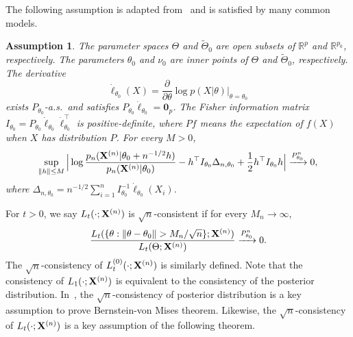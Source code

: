 \documentclass[11pt]{article}
\theoremstyle{plain}
\newtheorem{assumption}{\quad\quad Assumption}
\theoremstyle{definition}
\theoremstyle{remark}
\begin{document}
The following assumption is adapted from~\cite{Kleijn2012The} and is satisfied by many common models. 
\begin{assumption}\label{Assumption1}
    The parameter spaces $\Theta$ and $\tilde{\Theta}_0$ are open subsets of $\mathbb{R}^p$ and $\mathbb{R}^{p_0}$, respectively.
    The parameters $\theta_0$ and $\nu_0$ are inner points of $\Theta$ and $\tilde{\Theta}_0$, respectively.
    The derivative 
$$\dot{\ell}_{\theta_0}(X)=\frac{\partial}{\partial \theta}\log p(X|\theta)\Big|_{\theta=\theta_0}$$
exists $P_{\theta_0}$-a.s.\ and satisfies $P_{\theta_0}\dot{\ell}_{\theta_0}=\mathbf{0}_p$.
The Fisher information matrix $I_{\theta_0}=P_{\theta_0}\dot{\ell}_{\theta_0}\dot{\ell}_{\theta_0}^\top $ is positive-definite, where $P f$ means the expectation of $f(X)$ when $X$ has distribution $P$.
For every $M>0$,
    \begin{equation*}
        \sup_{\|h\|\leq M}\Big|
         \log \frac{p_n(\mathbf{X}^{(n)}|\theta_0+n^{-1/2}h)}{p_n(\mathbf{X}^{(n)}|\theta_0)}-h^\top  I_{\theta_0}\Delta_{n,\theta_0}+\frac{1}{2}h^\top  I_{\theta_0}h
         \Big|\xrightarrow{P^n_{\theta_0}}0,
    \end{equation*}
    where $\Delta_{n,\theta_0}=n^{-1/2}\sum_{i=1}^n I_{\theta_0}^{-1}\dot{\ell}_{\theta_0}(X_i)$.
\end{assumption}     
For $t>0$, we say $L_t(\cdot;\mathbf{X}^{(n)})$ is $\sqrt{n}$-consistent if for every $M_n\to \infty$,
    $$
    \frac{L_t({\{\theta:\|\theta-\theta_0\|> M_n/\sqrt{n}\}};\BX^{(n)})}{L_t(\Theta;\BX^{(n)})}\xrightarrow{P_{\theta_0}^n} 0.
    $$
    The $\sqrt{n}$-consistency of $L_t^{(0)}(\cdot;\mathbf{X}^{(n)})$ is similarly defined.
    Note that the consistency of $L_1(\cdot;\mathbf{X}^{(n)})$ is equivalent to the consistency of the posterior distribution.
    In~\cite{Kleijn2012The}, the $\sqrt{n}$-consistency of posterior distribution is a key assumption to prove Bernstein-von Mises theorem.
    Likewise, the $\sqrt{n}$-consistency of $L_t(\cdot;\mathbf{X}^{(n)})$ is a key assumption of the following theorem.
\end{document}
